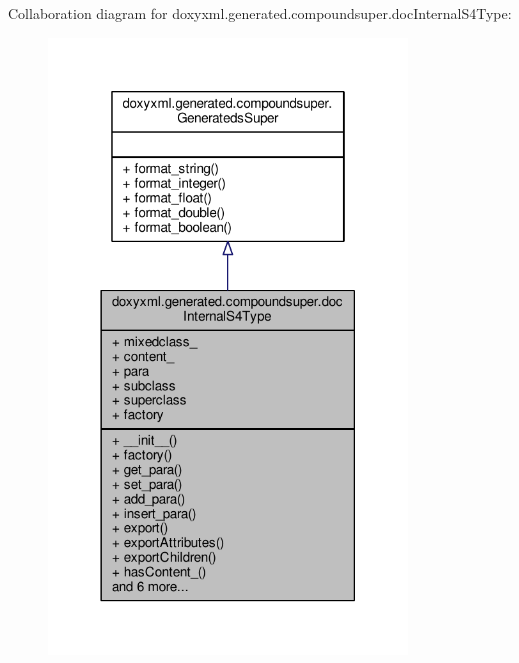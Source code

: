 Collaboration diagram for doxyxml.\+generated.\+compoundsuper.\+doc\+Internal\+S4\+Type\+:
\nopagebreak
\begin{figure}[H]
\begin{center}
\leavevmode
\includegraphics[width=270pt]{d6/d30/classdoxyxml_1_1generated_1_1compoundsuper_1_1docInternalS4Type__coll__graph}
\end{center}
\end{figure}
